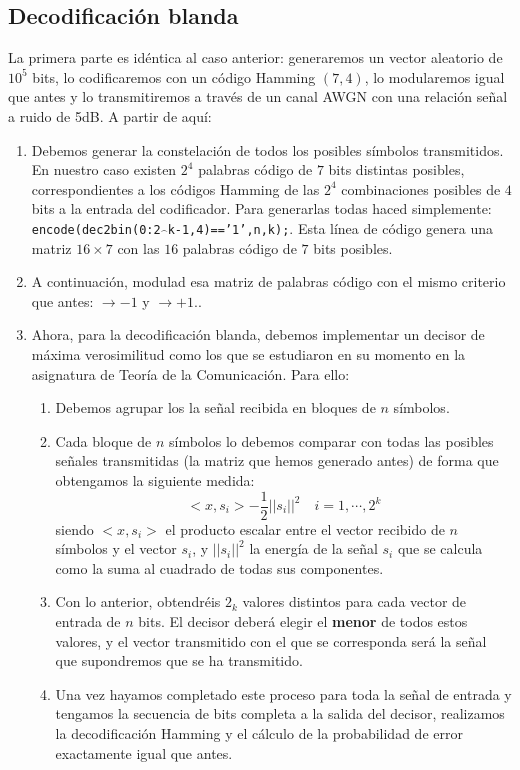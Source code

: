 \documentclass[es,practica,12pt]{uah}
\begin{document}
\subsection{Decodificación blanda}

La primera parte es idéntica al caso anterior: generaremos un vector aleatorio de $10^5$ bits, lo codificaremos con un código Hamming $(7,4)$, lo modularemos igual que antes y lo transmitiremos a través de un canal AWGN con una relación señal a ruido de 5dB. A partir de aquí:

\begin{enumerate}
	\item Debemos generar la constelación de todos los posibles símbolos transmitidos. En nuestro caso existen $2^4$ palabras código de $7$ bits distintas posibles, correspondientes a los códigos Hamming de las $2^4$ combinaciones posibles de $4$ bits a la entrada del codificador. Para generarlas todas haced simplemente: \texttt{encode(dec2bin(0:2$\hat{\,\,\,}$k-1,4)=='1',n,k);}. Esta línea de código genera una matriz $16\times 7$ con las $16$ palabras código de $7$ bits posibles. 
	\item A continuación, modulad esa matriz de palabras código con el mismo criterio que antes:  $\rightarrow -1$ y  $\rightarrow +1$..
	\item Ahora, para la decodificación blanda, debemos implementar un decisor de máxima verosimilitud como los que se estudiaron en su momento en la asignatura de Teoría de la Comunicación. Para ello:
	\begin{enumerate}
		\item Debemos agrupar los la señal recibida en bloques de $n$ símbolos. 
		\item Cada bloque de $n$ símbolos lo debemos comparar con todas las posibles señales transmitidas (la matriz que hemos generado antes) de forma que obtengamos la siguiente medida:
		\begin{displaymath}
			<x, s_i> - \frac{1}{2} ||s_i||^2	\quad i=1, \cdots, 2^k
		\end{displaymath}
		siendo $<x, s_i>$ el producto escalar entre el vector recibido de $n$ símbolos y el vector $s_i$, y $||s_i||^2$ la energía de la señal $s_i$ que se calcula como la suma al cuadrado de todas sus componentes.
		\item Con lo anterior, obtendréis $2_k$ valores distintos para cada vector de entrada de $n$ bits. El decisor deberá elegir el {\bf menor} de todos estos valores, y el vector transmitido con el que se corresponda será la señal que supondremos que se ha transmitido. 
		\item Una vez hayamos completado este proceso para toda la señal de entrada y tengamos la secuencia de bits completa a la salida del decisor, realizamos la decodificación Hamming y el cálculo de la probabilidad de error exactamente igual que antes. 
	\end{enumerate}
\end{enumerate}
\end{document}
